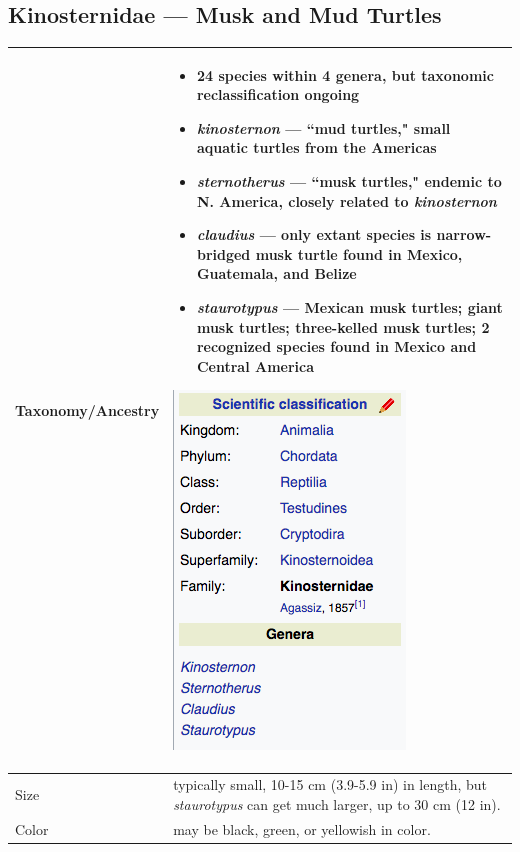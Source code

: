 \subsection{Kinosternidae --- Musk and Mud Turtles}
\begin{center}
\begin{longtabu} to 
	\hline
	Taxonomy/Ancestry &
	\begin{itemize}[noitemsep]
		\item 24 species within 4 genera, but taxonomic reclassification ongoing
		\item \emph{kinosternon} --- ``mud turtles," small aquatic turtles from the Americas
		\item \emph{sternotherus} --- ``musk turtles," endemic to N. America, closely related to \emph{kinosternon}
		\item \emph{claudius} --- only extant species is narrow-bridged musk turtle found in Mexico, Guatemala, and Belize
		\item \emph{staurotypus} --- Mexican musk turtles; giant musk turtles; three-kelled musk turtles; 2 recognized species found in Mexico and Central America
	\end{itemize}
	
	\begin{center} \includegraphics[scale=0.5]{testudines/kinosternidae/tax} \end{center}
	 \\
	\hline
	Size & 
	typically small, 10-15 cm (3.9-5.9 in) in length, but \emph{staurotypus} can get much larger, up to 30 cm (12 in).
	\\
	\hline
	Color &
	may be black, green, or yellowish in color. 
	

\end{longtabu}
\end{center}
